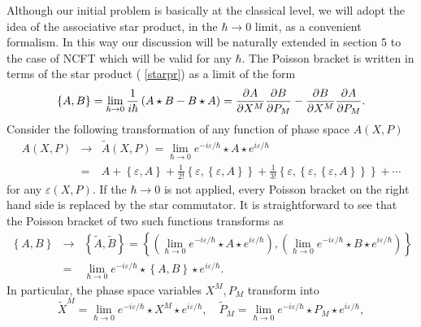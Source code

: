 \documentclass[a4paper,12pt]{article}
\begin{document}
Although our initial problem is basically at the classical level, we will
adopt the idea of the associative star product, in the $\hbar \rightarrow 0$
limit, as a convenient formalism. In this way our discussion will be
naturally extended in section 5 to the case of NCFT which will be valid for
any $\hbar $. The Poisson bracket is written in terms of the star product (%
\ref{starpr}) as a limit of the form
\begin{equation}
\left\{ A,B\right\} =\lim_{\hbar \rightarrow 0}\frac{1}{i\hbar }\left(
A\star B-B\star A\right) =\frac{\partial A}{\partial X^{M}}\frac{\partial B}{%
\partial P_{M}}-\frac{\partial B}{\partial X^{M}}\frac{\partial A}{\partial
P_{M}}.
\end{equation}
Consider the following transformation of any function of phase space $%
A\left( X,P\right) $%
\begin{eqnarray}
A\left( X,P\right) &\rightarrow &\tilde{A}\left( X,P\right) =\lim_{\hbar
\rightarrow 0}e^{-i\varepsilon /\hbar }\star A\star e^{i\varepsilon /\hbar }
\\
&=&A+\left\{ \varepsilon ,A\right\} +\frac{1}{2!}\left\{ \varepsilon
,\left\{ \varepsilon ,A\right\} \right\} +\frac{1}{3!}\left\{ \varepsilon
,\left\{ \varepsilon ,\left\{ \varepsilon ,A\right\} \right\} \right\}
+\cdots
\end{eqnarray}
for any $\varepsilon \left( X,P\right) .$ If the $\hbar \rightarrow 0$ is
not applied, every Poisson bracket on the right hand side is replaced by the
star commutator. It is straightforward to see that the Poisson bracket of
two such functions transforms as
\begin{eqnarray}
\left\{ A,B\right\} &\rightarrow &\left\{ \tilde{A},\tilde{B}\right\}
=\left\{ \left( \lim_{\hbar \rightarrow 0}e^{-i\varepsilon /\hbar }\star
A\star e^{i\varepsilon /\hbar }\right) ,\left( \lim_{\hbar \rightarrow
0}e^{-i\varepsilon /\hbar }\star B\star e^{i\varepsilon /\hbar }\right)
\right\} \\
&=&\lim_{\hbar \rightarrow 0}e^{-i\varepsilon /\hbar }\star \left\{
A,B\right\} \star e^{i\varepsilon /\hbar }.  \label{transpoisson}
\end{eqnarray}
In particular, the phase space variables $X^{M},P_{M}$ transform into
\begin{equation}
\tilde{X}^{M}=\lim_{\hbar \rightarrow 0}e^{-i\varepsilon /\hbar }\star
X^{M}\star e^{i\varepsilon /\hbar },\quad \tilde{P}_{M}=\lim_{\hbar
\rightarrow 0}e^{-i\varepsilon /\hbar }\star P_{M}\star e^{i\varepsilon
/\hbar },  \label{canonic}
\end{equation}
\end{document}
